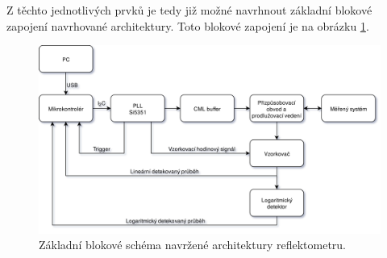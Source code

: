 Z těchto jednotlivých prvků je tedy již možné navrhnout základní blokové zapojení navrhované architektury. Toto blokové zapojení je na obrázku \ref{reflectometer_blockdiagram}.

\begin{figure}[htbp]\includegraphics[width=\textwidth,keepaspectratio]{images/reflectometer_blockdiagram_simple.png}\caption{Základní blokové schéma navržené architektury reflektometru.}\label{reflectometer_blockdiagram}\end{figure}